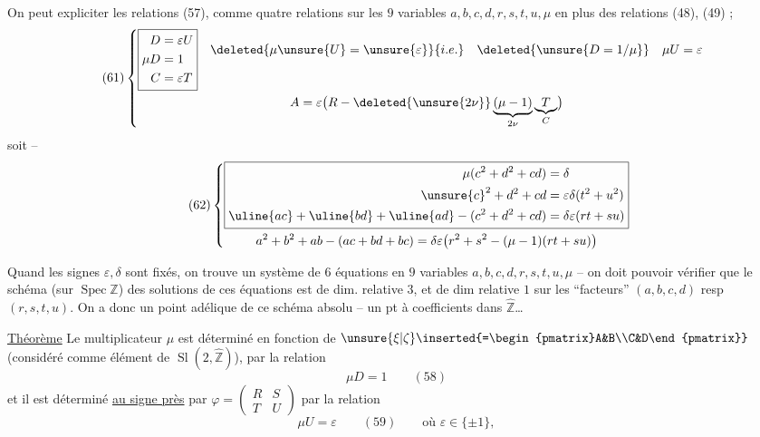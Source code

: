 On peut expliciter les relations (57), comme  quatre relations sur les $9$ variables $a,b,c,d,r,s,t,u,\mu$ en plus des relations (48), (49) ;
\[
\tag{61}
\left\{\begin{gathered}
\boxed{\begin{aligned}
D&=\varepsilon U\\
\mu D&=1\\
C&=\varepsilon T
\end{aligned}}
\quad\begin{aligned}
\deleted{\mu\unsure{U}=\unsure{\varepsilon}}{i.e.}\quad\deleted{\unsure{D=1/\mu}}\quad\mu U=\varepsilon\\
&
\end{aligned}\\
A=\varepsilon\bigl(R-\deleted{\unsure{2\nu}}\underbrace{(\mu-1)}_{2\nu}\underbrace{T}_{C}\bigr)
\end{gathered}\right.
\]
soit --  
\[
\tag{62}
\left\{\begin{gathered}
\boxed{\begin{aligned}
\mu(c^2+d^2+cd)&=\delta\\
\unsure{c}^2+d^2+cd&=\varepsilon\delta(t^2+u^2)\\
\uline{ac}+\uline{bd}+\uline{ad}-(c^2+d^2+cd)&=\delta\varepsilon(rt+su)
\end{aligned}}\\
a^2+b^2+ab-(ac+bd+bc)=\delta\varepsilon\bigl(r^2+s^2-(\mu-1)(rt+su)\bigr)
\end{gathered}\right.
\]

Quand les signes $\varepsilon,\delta$ sont fixés, on trouve  un système de $6$ équations en $9$ variables $a,b,c,d,r,s,t,u,\mu$ -- on doit pouvoir vérifier que le schéma (sur $\operatorname{Spec}\mathbb Z$) des solutions de ces équations est de dim. relative $3$, et de dim relative $1$ sur les ``facteurs'' $(a,b,c,d)$ resp $(r,s,t,u)$. On a donc un point adélique de ce schéma absolu -- un pt à coefficients dans $\widehat{\mathbb Z}$\ldots
{}

\uline{Théorème} Le multiplicateur $\mu$ est déterminé en fonction de $\unsure{\xi|\zeta}\inserted{=\begin{pmatrix}A&B\\C&D\end{pmatrix}}$ (considéré comme élément de $\operatorname{Sl}(2,\widehat{\mathbb Z})$), par la relation
\[
\mu D=1\qquad(58)
\]
\unsure{\textup{(+)}}
et il est déterminé \uline{au signe près} par $\varphi=\begin{pmatrix}R&S\\T&U\end{pmatrix}$ par la relation
\[
\mu U=\varepsilon\qquad(59)\qquad\text{où }\varepsilon\in\{\pm1\},
\]

